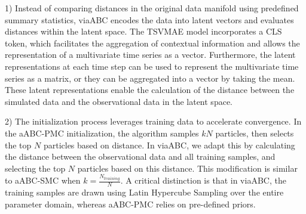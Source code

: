 \documentclass[12pt]{article} %
\begin{document}
1) Instead of comparing distances in the original data manifold using predefined summary statistics, viaABC encodes the data into latent vectors and evaluates distances within the latent space. The TSVMAE model incorporates a CLS token, which facilitates the aggregation of contextual information and allows the representation of a multivariate time series as a vector. Furthermore, the latent representations at each time step can be used to represent the multivariate time series as a matrix, or they can be aggregated into a vector by taking the mean. These latent representations enable the calculation of the distance between the simulated data and the observational data in the latent space.

2) The initialization process leverages training data to accelerate convergence. In the aABC-PMC initialization, the algorithm samples $kN$ particles, then selects the top $N$ particles based on distance. In viaABC, we adapt this by calculating the distance between the observational data and all training samples, and selecting the top $N$ particles based on this distance. This modification is similar to aABC-SMC when $k = \frac{N_{training}}{N}$. A critical distinction is that in viaABC, the training samples are drawn using Latin Hypercube Sampling over the entire parameter domain, whereas aABC-PMC relies on pre-defined priors.


\end{document}

